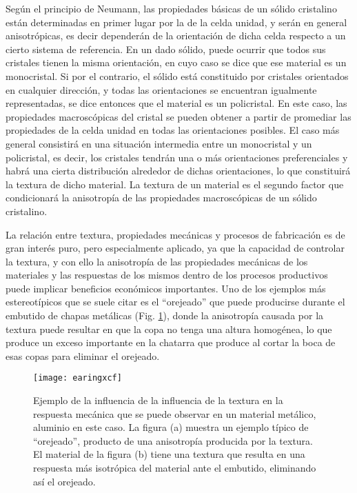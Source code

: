 Según el principio de Neumann\cite{nye1985physical}, las propiedades básicas de un sólido cristalino están determinadas en primer lugar por la de la celda unidad, y serán en general anisotrópicas, es decir dependerán de la orientación de dicha celda respecto a un cierto sistema de referencia.
En un dado sólido, puede ocurrir que todos sus cristales tienen la misma orientación, en cuyo caso se dice que ese material es un monocristal.
Si por el contrario, el sólido está constituido por cristales orientados en cualquier dirección, y todas las orientaciones se encuentran igualmente representadas, se dice entonces que el material es un policristal.
En este caso, las propiedades macroscópicas del cristal se pueden obtener a partir de promediar las propiedades de la celda unidad en todas las orientaciones posibles.
El caso más general consistirá en una situación intermedia entre un monocristal y un policristal, es decir, los cristales tendrán una o más orientaciones preferenciales y habrá una cierta distribución alrededor de dichas orientaciones, lo que constituirá la textura de dicho material. 
La textura de un material es el segundo factor que condicionará la anisotropía de las propiedades macroscópicas de un sólido cristalino.

La relación entre textura, propiedades mecánicas y procesos de fabricación es de gran interés puro, pero especialmente aplicado, ya que la capacidad de controlar la textura, y con ello la anisotropía de las propiedades mecánicas de los materiales y las respuestas de los mismos dentro de los procesos productivos puede implicar beneficios económicos importantes.
Uno de los ejemplos más estereotípicos que se suele citar es el ``orejeado'' que puede producirse durante el embutido de chapas metálicas (Fig. \ref{fig:earing}), donde la anisotropía causada por la textura puede resultar en que la copa no tenga una altura homogénea, lo que produce un exceso importante en la chatarra que produce al cortar la boca de esas copas para eliminar el orejeado.

\begin{figure}[h!]
  \centering
  \texttt{[image: earingxcf]}
  \caption{Ejemplo de la influencia de la influencia de la textura en la respuesta mecánica que se puede observar en un material metálico, aluminio en este caso. La figura (a) muestra un ejemplo típico de ``orejeado'', producto de una anisotropía producida por la textura. El material de la figura (b) tiene una textura que resulta en una respuesta más isotrópica del material ante el embutido, eliminando así el orejeado. }
  \label{fig:earing}
\end{figure}

